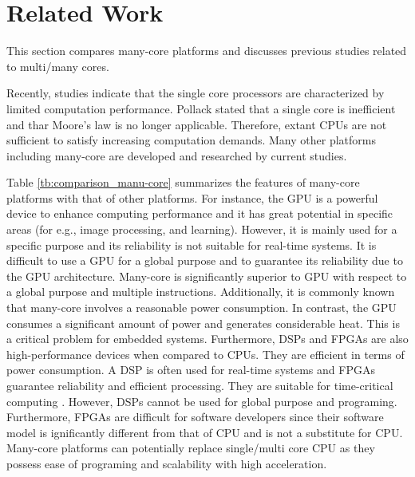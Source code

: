 \documentclass{sig-alternate-05-2015}
\begin{document}
\section{Related Work}
\label{sec:related work}
This section compares many-core platforms and discusses previous studies related to multi/many cores.

Recently, studies indicate that the single core processors are characterized by limited computation performance.
Pollack stated that a single core is inefficient \cite{pollack1999new} and thar Moore's law \cite{moore2006cramming} is no longer applicable. 
Therefore, extant CPUs are not sufficient to satisfy increasing computation demands.
Many other platforms including many-core are developed and researched by current studies.

Table \ref{tb:comparison_manu-core} summarizes the features of many-core platforms with that of other platforms.
For instance, the GPU is a powerful device to enhance computing performance and it has great potential in specific areas (for e.g., image processing, and learning).
However, it is mainly used for a specific purpose and its reliability is not suitable for real-time systems.
It is difficult to use a GPU for a global purpose and to guarantee its reliability due to the GPU architecture.
Many-core is significantly superior to GPU with respect to a global purpose and multiple instructions.
Additionally, it is commonly known that many-core involves a reasonable power consumption.
In contrast, the GPU consumes a significant amount of power and generates considerable heat.
This is a critical problem for embedded systems.
Furthermore, DSPs and FPGAs are also high-performance devices when compared to CPUs.
They are efficient in terms of power consumption.
A DSP is often used for real-time systems and FPGAs guarantee reliability and efficient processing.
They are suitable for time-critical computing \cite{de2015kalray}.
However, DSPs cannot be used for global purpose and programing.
Furthermore, FPGAs are difficult for software developers since their software model is ignificantly different from that of CPU and is not a substitute for CPU.
Many-core platforms can potentially replace single/multi core CPU as they possess ease of programing and scalability with high acceleration.
\end{document}
